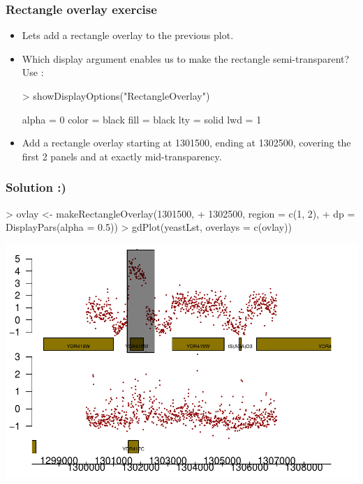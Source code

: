 \begin{frame}
  \frametitle{Rectangle overlay exercise}
  \begin{itemize}
  \item Lets add a rectangle overlay to the previous plot.
  \item Which display argument enables us to make the rectangle semi-transparent? Use :
\begin{Schunk}
\begin{Sinput}
> showDisplayOptions("RectangleOverlay")
\end{Sinput}
\begin{Soutput}
alpha  =  0 
color  =  black 
fill  =  black 
lty  =  solid 
lwd  =  1 
\end{Soutput}
\end{Schunk}
  \item Add a rectangle overlay starting at 1301500, ending at 1302500, covering the first 2 panels and at exactly mid-transparency.
  \end{itemize}
\end{frame}

\begin{frame}
  \frametitle{Solution :)}
\begin{Schunk}
\begin{Sinput}
> ovlay <- makeRectangleOverlay(1301500, 
+     1302500, region = c(1, 2), 
+     dp = DisplayPars(alpha = 0.5))
> gdPlot(yeastLst, overlays = c(ovlay))
\end{Sinput}
\end{Schunk}
\includegraphics{plots/fig-037}
\end{frame}

